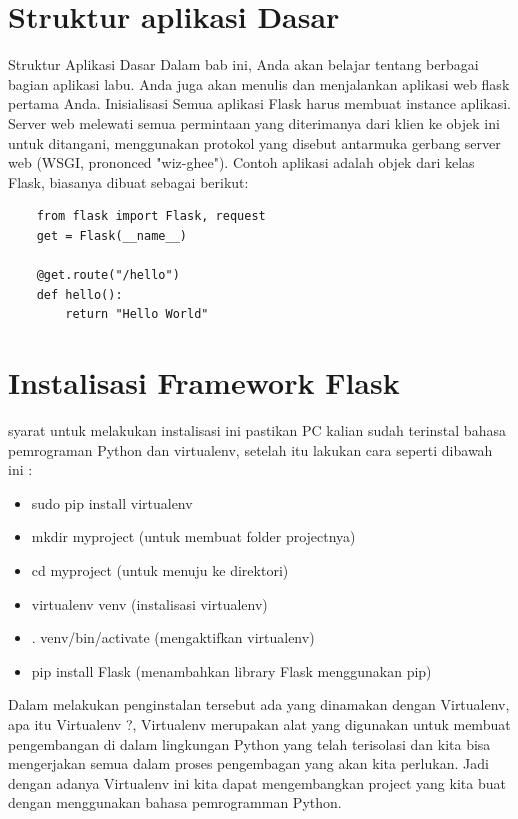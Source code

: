 \section{Struktur aplikasi Dasar}
Struktur Aplikasi Dasar 
Dalam bab ini, Anda akan belajar tentang berbagai bagian aplikasi labu. Anda juga akan menulis dan menjalankan aplikasi web flask pertama Anda. 
Inisialisasi 
Semua aplikasi Flask harus membuat instance aplikasi. Server web melewati semua permintaan yang diterimanya dari klien ke objek ini untuk ditangani, menggunakan protokol yang disebut antarmuka gerbang server web (WSGI, prononced "wiz-ghee"). 
Contoh aplikasi adalah objek dari kelas Flask, biasanya dibuat sebagai berikut: 

\begin{verbatim}
    from flask import Flask, request
    get = Flask(__name__)
    
    @get.route("/hello")
    def hello():
        return "Hello World"
\end{verbatim}


\section{Instalisasi Framework Flask}
syarat untuk melakukan instalisasi ini pastikan PC kalian sudah terinstal bahasa pemrograman Python dan virtualenv, setelah
itu lakukan cara seperti dibawah ini :
\begin{itemize}
    \item sudo pip install virtualenv 
    \item mkdir myproject (untuk membuat folder projectnya)
    \item cd myproject (untuk menuju ke direktori)
    \item virtualenv venv (instalisasi virtualenv)
    \item . venv/bin/activate (mengaktifkan virtualenv)
    \item pip install Flask (menambahkan library Flask menggunakan pip)
\end{itemize}
Dalam melakukan penginstalan tersebut ada yang dinamakan dengan Virtualenv, apa itu Virtualenv ?, Virtualenv merupakan alat yang
digunakan untuk membuat pengembangan di dalam lingkungan Python yang telah terisolasi dan kita bisa mengerjakan semua dalam
proses pengembagan yang akan kita perlukan. Jadi dengan adanya Virtualenv ini kita dapat mengembangkan project yang kita buat
dengan menggunakan bahasa pemrogramman Python.

